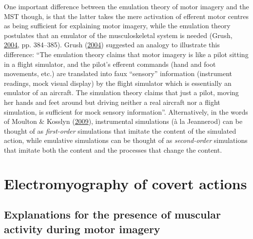 \documentclass[a4paper,12pt,twoside,openright,oldfontcommands]{memoir}
\begin{document}
One important difference between the emulation theory of motor imagery
and the MST though, is that the latter takes the mere activation of
efferent motor centres as being sufficient for explaining motor imagery,
while the emulation theory postulates that an emulator of the
musculoskeletal system is needed (Grush,
\protect\hyperlink{ref-grush_emulation_2004}{2004}, pp. 384--385). Grush
(\protect\hyperlink{ref-grush_emulation_2004}{2004}) suggested an
analogy to illustrate this difference: ``The emulation theory claims
that motor imagery is like a pilot sitting in a flight simulator, and
the pilot's efferent commands (hand and foot movements, etc.) are
translated into faux ``sensory'' information (instrument readings, mock
visual display) by the flight simulator which is essentially an emulator
of an aircraft. The simulation theory claims that just a pilot, moving
her hands and feet around but driving neither a real aircraft nor a
flight simulation, is sufficient for mock sensory information''.
Alternatively, in the words of Moulton \& Kosslyn
(\protect\hyperlink{ref-moulton_imagining_2009}{2009}), instrumental
simulations (à la Jeannerod) can be thought of as \emph{first-order}
simulations that imitate the content of the simulated action, while
emulative simulations can be thought of as \emph{second-order}
simulations that imitate both the content and the processes that change
the content.

\section{Electromyography of covert actions}\label{emg}

\subsection{Explanations for the presence of muscular activity during
motor
imagery}\label{explanations-for-the-presence-of-muscular-activity-during-motor-imagery}
\end{document}
